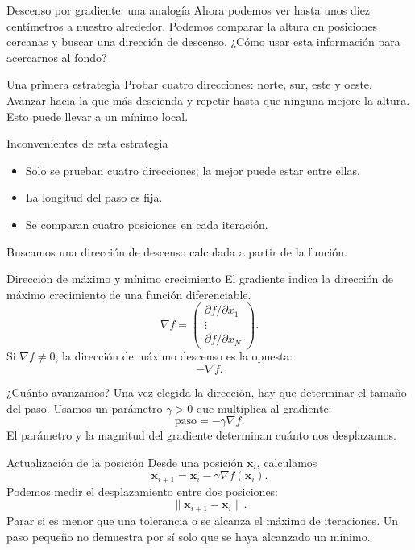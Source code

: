 \documentclass[main.tex]{subfiles}
\begin{document}
\begin{frame}[t]{Descenso por gradiente: una analogía}
Ahora podemos ver hasta unos diez centímetros a nuestro alrededor.
\bigskip
Podemos comparar la altura en posiciones cercanas y buscar una dirección de descenso.
\bigskip
¿Cómo usar esta información para acercarnos al fondo?
\end{frame}
\begin{frame}[t]{Una primera estrategia}
\small Probar cuatro direcciones: norte, sur, este y oeste. Avanzar hacia la que más descienda y repetir hasta que ninguna mejore la altura.
\medskip Esto puede llevar a un mínimo local.
\end{frame}
\begin{frame}[t]{Inconvenientes de esta estrategia}
\begin{itemize}
\item Solo se prueban cuatro direcciones; la mejor puede estar entre ellas.
\item La longitud del paso es fija.
\item Se comparan cuatro posiciones en cada iteración.
\end{itemize}
\bigskip
Buscamos una dirección de descenso calculada a partir de la función.
\end{frame}
\begin{frame}[t]{Dirección de máximo y mínimo crecimiento}
El gradiente indica la dirección de máximo crecimiento de una función diferenciable.
\[\nabla f=\begin{pmatrix}\partial f/\partial x_1\\\vdots\\\partial f/\partial x_N\end{pmatrix}.\]
Si $\nabla f\ne0$, la dirección de máximo descenso es la opuesta:
\[\boxed{-\nabla f}.\]
\end{frame}
\begin{frame}[t]{¿Cuánto avanzamos?}
Una vez elegida la dirección, hay que determinar el tamaño del paso.
\bigskip
Usamos un parámetro $\gamma>0$ que multiplica al gradiente:
\[\boxed{\text{paso}=-\gamma\nabla f}.\]
El parámetro y la magnitud del gradiente determinan cuánto nos desplazamos.
\end{frame}
\begin{frame}[t]{Actualización de la posición}
Desde una posición $\boldsymbol{x}_i$, calculamos
\[\boxed{\boldsymbol{x}_{i+1}=\boldsymbol{x}_i-\gamma\nabla f(\boldsymbol{x}_i)}.\]
Podemos medir el desplazamiento entre dos posiciones:
\[\|\boldsymbol{x}_{i+1}-\boldsymbol{x}_i\|.\]
Parar si es menor que una tolerancia o se alcanza el máximo de iteraciones. Un paso pequeño no demuestra por sí solo que se haya alcanzado un mínimo.
\end{frame}
\end{document}
